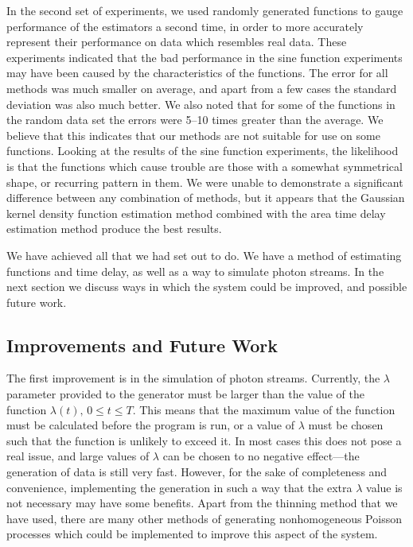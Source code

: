 \documentclass[a4paper,11pt]{article}
\begin{document}
In the second set of experiments, we used randomly generated
functions to gauge performance of the estimators a second time, in order to more
accurately represent their performance on data which resembles real data. These
experiments indicated that the bad performance in the sine function experiments
may have been caused by the characteristics of the functions. The error for all
methods was much smaller on average, and apart from a few cases the standard
deviation was also much better. We also noted that for some of the functions in
the random data set the errors were 5--10 times greater than the average. We
believe that this indicates that our methods are not suitable for use on some
functions. Looking at the results of the sine function experiments, the
likelihood is that the functions which cause trouble are those with a somewhat
symmetrical shape, or recurring pattern in them. We were unable to demonstrate a
significant difference between any combination of methods, but it appears that
the Gaussian kernel density function estimation method combined with the area
time delay estimation method produce the best results.

We have achieved all that we had set out to do. We have a method of estimating
functions and time delay, as well as a way to simulate photon streams. In the
next section we discuss ways in which the system could be improved, and possible
future work.
\subsection{Improvements and Future Work}
\label{sec-8-1}

The first improvement is in the simulation of photon streams. Currently, the
$\lambda$ parameter provided to the generator must be larger than the value of
the function $\lambda(t),\,0\leq t\leq T$. This means that the maximum value of
the function must be calculated before the program is run, or a value of
$\lambda$ must be chosen such that the function is unlikely to exceed it. In
most cases this does not pose a real issue, and large values of $\lambda$ can be
chosen to no negative effect---the generation of data is still very
fast. However, for the sake of completeness and convenience, implementing the
generation in such a way that the extra $\lambda$ value is not necessary may
have some benefits. Apart from the thinning method that we have used, there are
many other methods of generating nonhomogeneous Poisson
processes \cite{pasupathy2011,haugh2004,lewis1976simulation} which could be implemented to improve
this aspect of the system.
\end{document}
